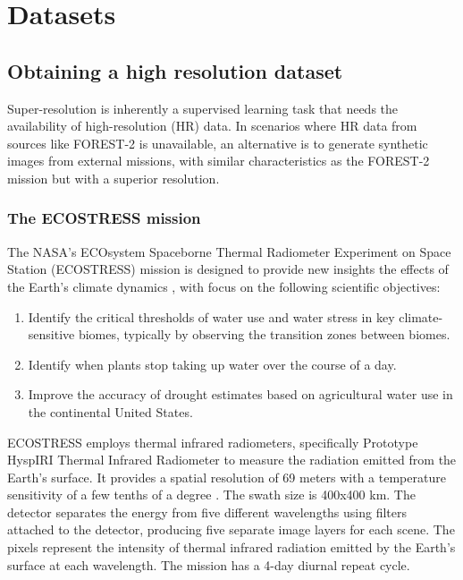 \section{Datasets}

\subsection{Obtaining a high resolution dataset}
    
    
Super-resolution is inherently a supervised learning task that needs the availability of high-resolution (HR) data. In scenarios where HR data from sources like FOREST-2 is unavailable, an alternative is to generate synthetic images from external missions, with similar characteristics as the FOREST-2 mission but with a superior resolution.

\subsubsection{The ECOSTRESS mission}

The NASA's ECOsystem Spaceborne Thermal Radiometer Experiment on Space Station (ECOSTRESS) mission is designed to provide new insights the effects of the Earth's climate dynamics \cite{ECOSTRESS2023}, with focus on the following scientific objectives:

\begin{enumerate}
    \item Identify the critical thresholds of water use and water stress in key climate-sensitive biomes, typically by observing the transition zones between biomes.
    \item Identify when plants stop taking up water over the course of a day.
    \item Improve the accuracy of drought estimates based on agricultural water use in the continental United States. 
\end{enumerate}

ECOSTRESS employs thermal infrared radiometers, specifically Prototype HyspIRI Thermal Infrared Radiometer \cite{PhyTIR2023} to measure the radiation emitted from the Earth's surface. It provides a spatial resolution of 69 meters with a temperature sensitivity of a few tenths of a degree \cite{ECOSTRESS2023}.  The swath size is 400x400 km. The detector separates the energy from five different wavelengths using filters attached to the detector, producing five separate image layers for each scene. The pixels represent the intensity of thermal infrared radiation emitted by the Earth's surface at each wavelength. The mission has a 4-day diurnal repeat cycle.

